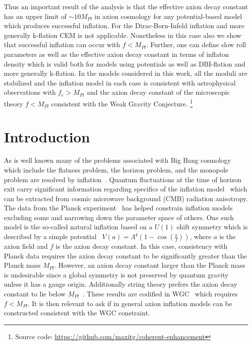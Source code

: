 \documentclass[12pt]{article}
\begin{document}
Thus an important result of the analysis is that the effective axion decay constant has an upper limit of $\sim 10 M_{Pl}$ in axion cosmology for any potential-based model which produces successful inflation.
For the Dirac-Born-Infeld inflation and more generally k-flation CEM is not applicable.
Nonetheless in this case also we show that successful inflation can occur with $f < M_{Pl}$.
Further, one can define slow roll parameters as well as the 
 effective axion decay constant in terms of inflaton density which is valid both for models using potentials as well as DBI-flation and more generally k-flation.
In the models considered in this work, all the moduli are stabilized and the inflation model in each case is consistent with astrophysical observations with $f_e > M_{Pl}$ and the axion decay constant of the microscopic theory $f < M_{Pl}$ consistent with the Weak Gravity Conjecture.
\footnote{Source code: \url{https://github.com/maxitg/coherent-enhancement}}
\newpage

\section{Introduction \label{sec:Introduction}}
As is well known many of the problems associated with Big Bang cosmology which include
the flatness problem, the horizon problem, and the monopole problem are resolved by inflation~\cite{Guth:1980zm, Starobinsky:1980te, Linde:1981mu, Albrecht:1982wi, Linde:1983gd}.
Quantum fluctuations at the time of horizon exit carry significant information regarding specifics of the inflation model~\cite{Mukhanov:1981xt, Hawking:1982cz, Starobinsky:1982ee, Guth:1982ec, Bardeen:1983qw, Cheung:2007st} which can be extracted from cosmic microwave background (CMB) radiation anisotropy.
The data from the Planck experiment~\cite{Akrami:2018vks, Akrami:2018odb, Array:2015xqh} has helped constrain inflation models excluding some and narrowing down the parameter space of others.
One such model is the so-called natural inflation based on a $U(1)$ shift symmetry which is described by a simple potential~\cite{Freese:1990rb, Adams:1992bn} $V\left(a\right) = \Lambda^4 \left(1 - \cos\left(\frac{a}{f}\right)\right)$, where $a$ is the axion field and $f$ is the axion decay constant.
In this case, consistency with Planck data requires the axion decay constant to be significantly greater than the Planck mass $M_{Pl}$.
However, an axion decay constant larger than the Planck mass is undesirable since a global symmetry is not preserved by quantum gravity unless it has a gauge origin.
Additionally string theory prefers the axion decay constant to lie below $M_{Pl}$~\cite{Banks:2003sx, Svrcek:2006yi}.
These results are codified in WGC~\cite{ArkaniHamed:2006dz} which requires $f < M_{Pl}$.
It is then relevant to ask if in general axion inflation models can be constructed consistent with the WGC constraint.
\end{document}
